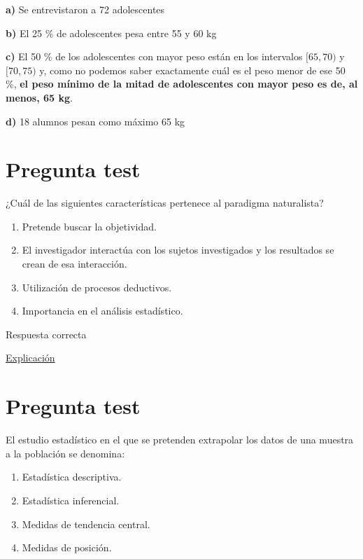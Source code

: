 \documentclass[
]{book}
\providecommand{\tightlist}{%
  \setlength{\itemsep}{0pt}\setlength{\parskip}{0pt}}
\begin{document}
\textbf{a)} Se entrevistaron a 72 adolescentes

\textbf{b)} El 25 \% de adolescentes pesa entre 55 y 60 kg

\textbf{c)} El 50 \% de los adolescentes con mayor peso están en los intervalos \([65,70)\) y \([70,75)\) y, como no podemos saber exactamente cuál es el peso menor de ese 50 \%, \textbf{el peso mínimo de la mitad de adolescentes con mayor peso es de, al menos, 65 kg}.

\textbf{d)} 18 alumnos pesan como máximo 65 kg

\hypertarget{pregunta-test-6}{%
\section{Pregunta test}\label{pregunta-test-6}}

¿Cuál de las siguientes características pertenece al paradigma naturalista?

\begin{enumerate}
\def\labelenumi{\alph{enumi})}
\tightlist
\item
  Pretende buscar la objetividad.
\item
  El investigador interactúa con los sujetos investigados y los resultados se crean de esa interacción.
\item
  Utilización de procesos deductivos.
\item
  Importancia en el análisis estadístico.
\end{enumerate}

Respuesta correcta

\href{https://www.encyclo.co.uk/meaning-of-Naturalistic_paradigm}{Explicación}

\hypertarget{pregunta-test-7}{%
\section{Pregunta test}\label{pregunta-test-7}}

El estudio estadístico en el que se pretenden extrapolar los datos de una muestra a la población se denomina:

\begin{enumerate}
\def\labelenumi{\alph{enumi})}
\tightlist
\item
  Estadística descriptiva.
\item
  Estadística inferencial.
\item
  Medidas de tendencia central.
\item
  Medidas de posición.
\end{enumerate}
\end{document}
